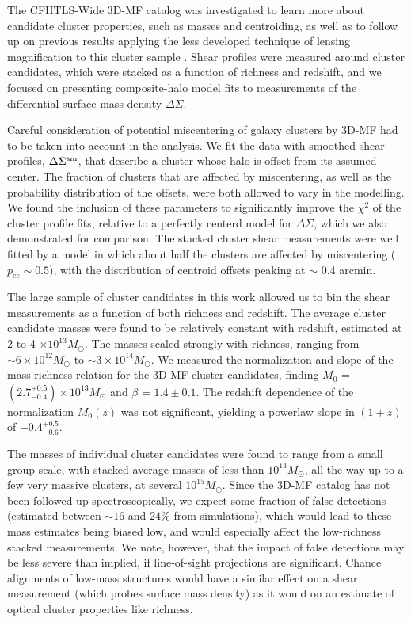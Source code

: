 The \ac{CFHTLS}-Wide \ac{3D-MF} catalog was investigated to learn more about candidate cluster properties, such as masses and centroiding, as well as to follow up on previous results applying the less developed technique of lensing magnification to this cluster sample \citep{Ford14}. Shear profiles were measured around cluster candidates, which were stacked as a function of richness and redshift, and we focused on presenting composite-halo model fits to measurements of the differential surface mass density $\Delta\Sigma$. 

Careful consideration of potential miscentering of galaxy clusters by \ac{3D-MF} had to be taken into account in the analysis. We fit the data with smoothed shear profiles, $\Delta\Sigma^{\rm sm}$, that describe a cluster whose halo is offset from its assumed center. The fraction of clusters that are affected by miscentering, as well as the probability distribution of the offsets, were both allowed to vary in the modelling. We found the inclusion of these parameters to significantly improve the $\chi^2$ of the cluster profile fits, relative to a perfectly centerd model for $\Delta\Sigma$, which we also demonstrated for comparison. The stacked cluster shear measurements were well fitted by a model in which about half the clusters are affected by miscentering ($p_{\mathrm{cc}} \sim 0.5$), with the distribution of centroid offsets peaking at $\sim$ 0.4 arcmin.

The large sample of cluster candidates in this work allowed us to bin the shear measurements as a function of both richness and redshift. The average cluster candidate masses were found to be relatively constant with redshift, estimated at 2 to 4 $\times 10^{13} M_{\odot}$. The masses scaled strongly with richness, ranging from $\sim 6 \times 10^{12} M_{\odot}$ to $\sim 3 \times 10^{14} M_{\odot}$. We measured the normalization and slope of the mass-richness relation for the \ac{3D-MF} cluster candidates, finding $M_0$ = $(2.7^{+0.5}_{-0.4}) \times 10^{13} M_{\odot}$ and $\beta$ = $1.4 \pm 0.1$. The redshift dependence of the normalization $M_0 (z)$ was not significant, yielding a powerlaw slope in $(1+z)$ of $-0.4^{+0.5}_{-0.6}$. 

The masses of individual cluster candidates were found to range from a small group scale, with stacked average masses of less than $10^{13} M_{\odot}$, all the way up to a few very massive clusters, at several $10^{15} M_{\odot}$. Since the \ac{3D-MF} catalog has not been followed up spectroscopically, we expect some fraction of false-detections (estimated between $\sim 16$ and $24$\% from simulations), which would lead to these mass estimates being biased low, and would especially affect the low-richness stacked measurements. We note, however, that the impact of false detections may be less severe than implied, if line-of-sight projections are significant. Chance alignments of low-mass structures would have a similar effect on a shear measurement (which probes surface mass density) as it would on an estimate of optical cluster properties like richness.

